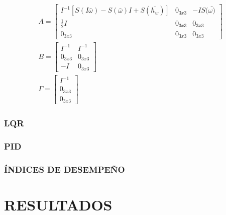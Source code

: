 \begin{gather}
	A = \left[\begin{array}{ccc}
		 I^{-1}\left[S(I\bar{\omega})-S(\bar{\omega})I+S(\bar{h_w})\right]& 0_{3x3} & -IS(\bar{\omega)}\\
		\frac{1}{2}I & 0_{3x3} & 0_{3x3} \\
		 0_{3x3}& 0_{3x3} & 0_{3x3}
	\end{array}\right] \label{eq:matrizA}\\[10pt]
	B= \left[\begin{array}{cc}
		I^{-1}&I^{-1}  \\
		0_{3x3}& 0_{3x3}  \\
		-I& 0_{3x3}
	\end{array}\right]\label{eq:matrizB}\\[10pt]			
	\Gamma =\left[\begin{array}{c}
		I^{-1}  \\
		0_{3x3} \\
		0_{3x3}
	\end{array}\right] \label{eq:matrizGamma}				
\end{gather}
 
\subsubsection{LQR}
\subsubsection{PID}
\subsubsection{ÍNDICES DE DESEMPEÑO}










\newpage
\section{RESULTADOS}

